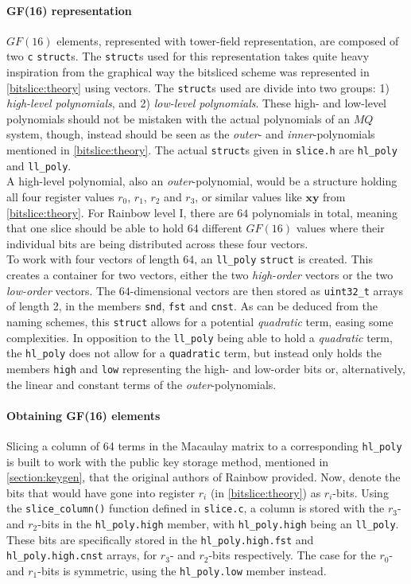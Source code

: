 \paragraph{GF(16) representation}
$GF(16)$ elements, represented with tower-field representation, are composed of two \texttt{c} \texttt{struct}s. The \texttt{struct}s used for this representation takes quite heavy inspiration from the graphical way the bitsliced scheme was represented in \cref{bitslice:theory} using vectors. The \texttt{struct}s used are divide into two groups: 1) \emph{high-level polynomials}, and 2) \emph{low-level polynomials}. These high- and low-level polynomials should not be mistaken with the actual polynomials of an $MQ$ system, though, instead should be seen as the \emph{outer}- and \emph{inner}-polynomials mentioned in \cref{bitslice:theory}. The actual \texttt{struct}s given in \texttt{slice.h} are \texttt{hl\_poly} and \texttt{ll\_poly}.
\medskip\\
A high-level polynomial, also an \emph{outer}-polynomial, would be a structure holding all four register values $r_0$, $r_1$, $r_2$ and $r_3$, or similar values like $\textbf{xy}$ from \cref{bitslice:theory}. For Rainbow level I, there are $64$ polynomials in total, meaning that one slice should be able to hold 64 different $GF(16)$ values where their individual bits are being distributed across these four vectors.
\medskip\\
To work with four vectors of length $64$, an \texttt{ll\_poly} \texttt{struct} is created. This creates a container for two vectors, either the two \emph{high-order} vectors or the two \emph{low-order} vectors. The $64$-dimensional vectors are then stored as \texttt{uint32\_t} arrays of length 2, in the members \texttt{snd}, \texttt{fst} and \texttt{cnst}. As can be deduced from the naming schemes, this \texttt{struct} allows for a potential \emph{quadratic} term, easing some complexities. In opposition to the \texttt{ll\_poly} being able to hold a \emph{quadratic} term, the \texttt{hl\_poly} does not allow for a \texttt{quadratic} term, but instead only holds the members \texttt{high} and \texttt{low} representing the high- and low-order bits or, alternatively, the linear and constant terms of the \textit{outer}-polynomials.
\paragraph{Obtaining GF(16) elements}
Slicing a column of 64 terms in the Macaulay matrix to a corresponding \texttt{hl\_poly} is built to work with the public key storage method, mentioned in \cref{section:keygen}, that the original authors of Rainbow provided. Now, denote the bits that would have gone into register $r_i$ (in \cref{bitslice:theory}) as $r_i$-bits. Using the \texttt{slice\_column()} function defined in \texttt{slice.c}, a column is stored with the $r_3$- and $r_2$-bits in the \texttt{hl\_poly.high} member, with \texttt{hl\_poly.high} being an \texttt{ll\_poly}. These bits are specifically stored in the \texttt{hl\_poly.high.fst} and \texttt{hl\_poly.high.cnst} arrays, for $r_3$- and $r_2$-bits respectively. The case for the $r_0$- and $r_1$-bits is symmetric, using the \texttt{hl\_poly.low} member instead.
